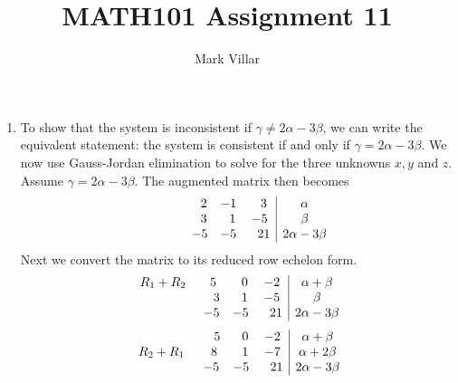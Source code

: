\documentclass[12pt]{amsart}
\title{MATH101 Assignment 11}
\author{Mark Villar}
\begin{document}
 

\maketitle 

\begin{enumerate}
	
	\item To show that the system is inconsistent if $\gamma\ne2\alpha-3\beta$, we can write the equivalent
		statement: the system is consistent if and only if $\gamma=2\alpha-3\beta$.  We now use 
		Gauss-Jordan elimination to solve for the three unknowns $x, y$ and $z$.
		\\
		Assume $\gamma=2\alpha-3\beta$. The augmented matrix then becomes
		\begin{align}
			\begin{array}{ccc|c}
				\hspace{1.2cm} \text{ } \text{ } 2&-1& \text{ } \text{ } 3& \alpha \\
				\hspace{1.2cm} \text{ } \text{ } 3& \text{ } \text{ } 1&-5& \beta  \\
				\hspace{1.2cm} -5& -5& \text{ } \text{ }21& 2\alpha-3\beta
			\end{array} \notag
		\end{align} 
		Next we convert the matrix to its reduced row echelon form.
		\begin{align}
			\begin{array}{ccc|c}
				R_1+R_2	 \hspace{0.55cm} \text{ } 5&\text{ } \text{ } 0&-2& \alpha+\beta\\
				\hspace{1.9cm} \text{ } \text{ } 3& \text{ } \text{ } 1&-5& \beta  \\
				\hspace{1.85cm} -5& -5& \text{ } \text{ }21& 2\alpha-3\beta
			\end{array} \notag
		\end{align} 
		\begin{align}
			\begin{array}{ccc|c}
				\hspace{1.95cm} \text{ } \text{ } 5&\text{ } \text{ } 0&-2& \alpha+\beta\\
				R_2+R_1	\hspace{0.5cm} \text{ } \text{ } 8& \text{ } \text{ } 1&-7& \alpha+2\beta  \\
				\hspace{1.85cm} -5& -5& \text{ } \text{ }21& 2\alpha-3\beta

\end{array}
\end{align}
\end{enumerate}
\end{document}
